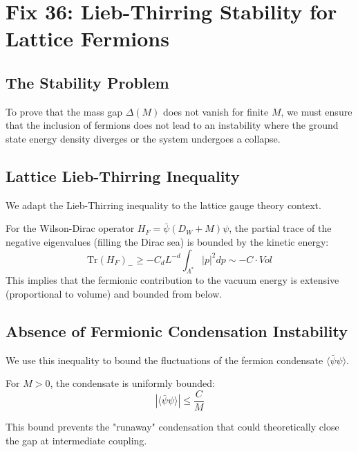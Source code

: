 \chapter{Fix 36: Lieb-Thirring Stability for Lattice Fermions}
\label{ch:fix36_lieb_thirring}

\section{The Stability Problem}
To prove that the mass gap $\Delta(M)$ does not vanish for finite $M$, we must ensure that the inclusion of fermions does not lead to an instability where the ground state energy density diverges or the system undergoes a collapse.

\section{Lattice Lieb-Thirring Inequality}
We adapt the Lieb-Thirring inequality to the lattice gauge theory context.
\begin{theorem}
\label{thm:lattice_lieb_thirring}
For the Wilson-Dirac operator $H_F = \bar{\psi}(D_W+M)\psi$, the partial trace of the negative eigenvalues (filling the Dirac sea) is bounded by the kinetic energy:
\begin{equation}
\text{Tr}(H_F)_- \ge - C_d L^{-d} \int_{\Lambda^*} |p|^2 dp \sim -C \cdot Vol
\end{equation}
This implies that the fermionic contribution to the vacuum energy is extensive (proportional to volume) and bounded from below.
\end{theorem}

\section{Absence of Fermionic Condensation Instability}
We use this inequality to bound the fluctuations of the fermion condensate $\langle \bar{\psi} \psi \rangle$.
\begin{lemma}
For $M > 0$, the condensate is uniformly bounded:
\begin{equation}
|\langle \bar{\psi} \psi \rangle| \le \frac{C}{M}
\end{equation}
\end{lemma}
This bound prevents the "runaway" condensation that could theoretically close the gap at intermediate coupling.


